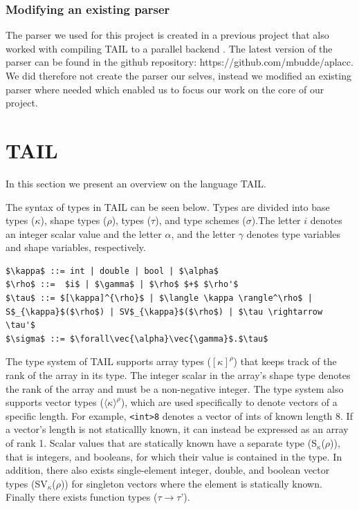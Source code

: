 \documentclass[11pt]{article}
\begin{document}
\subsubsection{Modifying an existing parser}
The parser we used for this project is created in a previous project that also worked with compiling TAIL to a parallel backend \cite{APLACC}. 
The latest version of the parser can be found in the github repository: https://github.com/mbudde/aplacc.
We did therefore not create the parser our selves,
instead we modified an existing parser where needed which enabled us to focus our work on the core of our project.

\section{TAIL}
\label{sec:tail}

In this section we present an overview on the language TAIL.

The syntax of types in TAIL can be seen below. Types are divided into base types ($\kappa$), shape types ($\rho$), types ($\tau$), and type schemes ($\sigma$).The letter $i$ denotes an integer scalar value and the letter $\alpha$, and the letter $\gamma$ denotes type variables and shape variables, respectively.
\begin{lstlisting}[numbers=none,frame=none]
$\kappa$ ::= int | double | bool | $\alpha$
$\rho$ ::=  $i$ | $\gamma$ | $\rho$ $+$ $\rho'$
$\tau$ ::= $[\kappa]^{\rho}$ | $\langle \kappa \rangle^\rho$ | S$_{\kappa}$($\rho$) | SV$_{\kappa}$($\rho$) | $\tau \rightarrow \tau'$
$\sigma$ ::= $\forall\vec{\alpha}\vec{\gamma}$.$\tau$
\end{lstlisting}
The type system of TAIL supports array types ($[\kappa]^{\rho}$) that keeps track of the rank of the array in its type.
The integer scalar in the array's shape type denotes the rank of the array and must be a non-negative integer.
The type system also supports vector types ($\langle \kappa \rangle^\rho$), which are used specifically to denote vectors of a specific length. For example, {\tt <int>8} denotes a vector of ints of known length 8. If a vector's length is not staticallly known, it can instead be expressed as an array of rank 1.
Scalar values that are statically known have a separate type (S$_{\kappa}$($\rho$)), that is integers, and booleans,
for which their value is contained in the type.
In addition, there also exists single-element integer, double, and boolean vector types (SV$_{\kappa}$($\rho$)) for singleton vectors where the element is statically known.
Finally there exists function types ($\tau \rightarrow \tau$').
\end{document}
